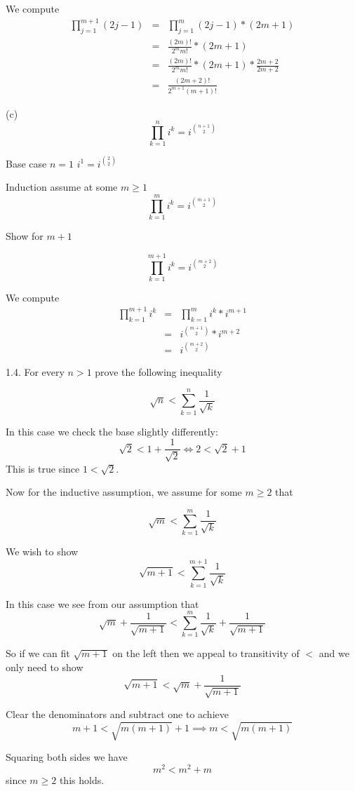 \documentclass[16 pt]{amsart}
\theoremstyle{definition}
\theoremstyle{remark}
\numberwithin{equation}{subsection}
\begin{document}
We compute
\begin{eqnarray}
\prod_{j=1}^{m+1} (2j-1) & = & \prod_{j=1}^{m} (2j-1) * (2m+1)\nonumber \\
& = & \frac{(2m)!}{2^m m!} * (2m+1) \nonumber \\
& = & \frac{(2m)!}{2^m m!} * (2m+1) * \frac{2m+2}{2m+2} \nonumber \\
& = & \frac{(2m+2)!}{2^{m+1}(m+1)!} \nonumber
\end{eqnarray}

(c)
\[
\prod_{k=1}^{n} i^k = i^{\binom{n+1}{2}}
\]


Base case $n=1$ $i^1= i^{\binom{2}{2}}$


Induction assume at some $m\ge 1$ 
\[
\prod_{k=1}^{m} i^k = i^{\binom{m+1}{2}}
\]

Show for $m+1$

\[
\prod_{k=1}^{m+1} i^k = i^{\binom{m+2}{2}}
\]

We compute
\begin{eqnarray}
\prod_{k=1}^{m+1} i^k &=& \prod_{k=1}^{m}i^k * i^{m+1}\nonumber \\
&=&  i^{\binom{m+1}{2}}* i^{m+2}\nonumber\\
& = & i^{\binom{m+2}{2}} \nonumber
\end{eqnarray}

1.4.  For every $n>1$ prove the following inequality

\[
\sqrt{n} < \sum_{k=1}^{n} \frac{1}{\sqrt{k}}
\]

In this case we check the base slightly differently:
\[
\sqrt{2} < 1 + \frac{1}{\sqrt{2}}  \iff 2 < \sqrt{2} +1
\]
This is true since $1<\sqrt{2}$.

Now for the inductive assumption, we assume for some $m\ge 2$ that

\[
\sqrt{m} < \sum_{k=1}^{m} \frac{1}{\sqrt{k}}
\]

We wish to show
\[
\sqrt{m+1} < \sum_{k=1}^{m+1} \frac{1}{\sqrt{k}}
\]


In this case we see from our assumption that
\[
\sqrt{m} + \frac{1}{\sqrt{m+1}} < \sum_{k=1}^{m} \frac{1}{\sqrt{k}} + \frac{1}{\sqrt{m+1}}
\]

So if we can fit $\sqrt{m+1}$ on the left then we appeal to transitivity of $<$ and we only need to show
\[
\sqrt{m+1} < \sqrt{m} + \frac{1}{\sqrt{m+1}}
\]

Clear the denominators and subtract one to achieve
\[
m+1 < \sqrt{m(m+1)} + 1 \implies m < \sqrt{m(m+1)}
\]

Squaring both sides we have
\[
m^2 < m^2 + m
\]
since $m\ge 2$ this holds.\\
\end{document}
